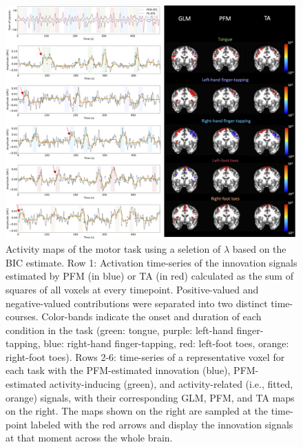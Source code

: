 \begin{figure}[t!]
    \begin{center}
        \includegraphics[width=\textwidth]{figures/task_maps.png}
    \end{center}
    \caption{Activity maps of the motor task using a seletion of $\lambda$ based on the BIC estimate. Row 1: Activation time-series of the innovation signals estimated by PFM (in blue) or TA (in red) calculated as the sum of squares of all voxels at every timepoint. Positive-valued and negative-valued contributions were separated into two distinct time-courses. Color-bands indicate the onset and duration of each condition in the task (green: tongue, purple: left-hand finger-tapping, blue: right-hand finger-tapping, red: left-foot toes, orange: right-foot toes). Rows 2-6: time-series of a representative voxel for each task with the PFM-estimated innovation (blue), PFM-estimated activity-inducing (green), and activity-related (i.e., fitted, orange) signals, with their corresponding GLM, PFM, and TA maps on the right. The maps shown on the right are sampled at the time-point labeled with the red arrows and display the innovation signals at that moment across the whole brain.}
\label{fig:task_maps}
\end{figure}

